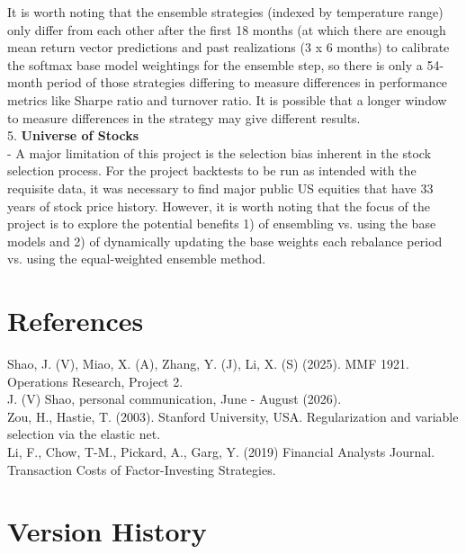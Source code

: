 \documentclass{article}
\begin{document}
It is worth noting that the ensemble strategies (indexed by temperature range) only differ from each other after the first 18 months (at which there are enough mean return vector predictions and past realizations (3 x 6 months) to calibrate the softmax base model weightings for the ensemble step, so there is only a 54-month period of those strategies differing to measure differences in performance metrics like Sharpe ratio and turnover ratio. It is possible that a longer window to measure differences in the strategy may give different results.\\

5. \textbf{Universe of Stocks}\\

- A major limitation of this project is the selection bias inherent in the stock selection process. For the project backtests to be run as intended with the requisite data, it was necessary to find major public US equities that have 33 years of stock price history. However, it is worth noting that the focus of the project is to explore the potential benefits 1) of ensembling vs. using the base models and 2) of dynamically updating the base weights each rebalance period vs. using the equal-weighted ensemble method.\\

\break

\section{References}

Shao, J. (V), Miao, X. (A), Zhang, Y. (J), Li, X. (S) (2025). MMF 1921. Operations Research, Project 2. \\

J. (V) Shao, personal communication, June - August (2026).\\

Zou, H., Hastie, T. (2003). Stanford University, USA. Regularization and variable selection via the elastic net.\\

Li, F., Chow, T-M., Pickard, A., Garg, Y. (2019) Financial Analysts Journal. Transaction Costs of Factor-Investing Strategies.\\

\break

\section{Version History}
\end{document}
